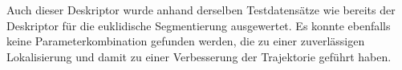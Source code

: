Auch dieser Deskriptor wurde anhand derselben Testdatensätze wie bereits der Deskriptor für die euklidische Segmentierung ausgewertet. Es konnte ebenfalls keine Parameterkombination gefunden werden, die zu einer zuverlässigen Lokalisierung und damit zu einer Verbesserung der Trajektorie geführt haben. 

%
%
%
%
%
%
%
%
%
%

